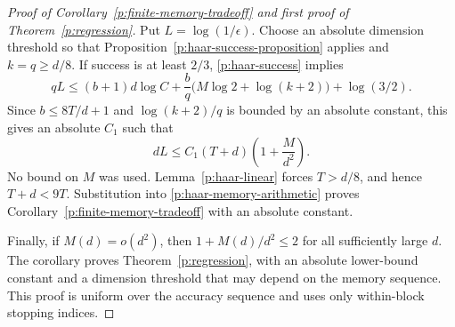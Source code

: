 \begin{proof}[Proof of Corollary~\ref{p:finite-memory-tradeoff} and first
proof of Theorem~\ref{p:regression}]
Put \(L=\log(1/\epsilon)\). Choose an absolute dimension threshold so
that Proposition~\ref{p:haar-success-proposition} applies and
\(k=q\ge d/8\). If success is at least \(2/3\),
\eqref{p:haar-success} implies
\[
 qL\le (b+1)d\log C
       +\frac bq\bigl(M\log2+\log(k+2)\bigr)
       +\log(3/2).
\]
Since \(b\le8T/d+1\) and \(\log(k+2)/q\) is bounded by an absolute
constant, this gives an absolute \(C_1\) such that
\begin{equation}\label{p:haar-memory-arithmetic}
 dL\le C_1(T+d)\left(1+\frac M{d^2}\right).
\end{equation}
No bound on \(M\) was used. Lemma~\ref{p:haar-linear} forces
\(T>d/8\), and hence \(T+d<9T\). Substitution into
\eqref{p:haar-memory-arithmetic} proves
Corollary~\ref{p:finite-memory-tradeoff} with an absolute constant.

Finally, if \(M(d)=o(d^2)\), then \(1+M(d)/d^2\le2\) for all
sufficiently large \(d\). The corollary proves
Theorem~\ref{p:regression}, with an absolute lower-bound constant and a
dimension threshold that may depend on the memory sequence. This proof
is uniform over the accuracy sequence and uses only within-block stopping
indices.
\end{proof}
